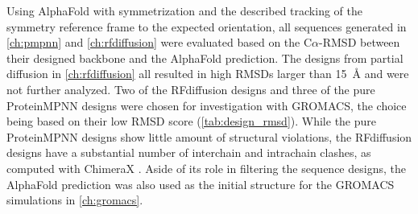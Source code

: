 Using AlphaFold with symmetrization and the described tracking of the symmetry reference frame to the expected orientation, all sequences generated in \autoref{ch:pmpnn} and \autoref{ch:rfdiffusion} were evaluated based on the C$\alpha$-RMSD between their designed backbone and the AlphaFold prediction. The designs from partial diffusion in \autoref{ch:rfdiffusion} all resulted in high RMSDs larger than \SI{15}{\angstrom} and were not further analyzed. Two of the RFdiffusion designs and three of the pure ProteinMPNN designs were chosen for investigation with GROMACS, the choice being based on their low RMSD score (\autoref{tab:design_rmsd}). While the pure ProteinMPNN designs show little amount of structural violations, the RFdiffusion designs have a substantial number of interchain and intrachain clashes, as computed with ChimeraX \cite{ChimeraX2023}. Aside of its role in filtering the sequence designs, the AlphaFold prediction was also used as the initial structure for the GROMACS simulations in \autoref{ch:gromacs}.


